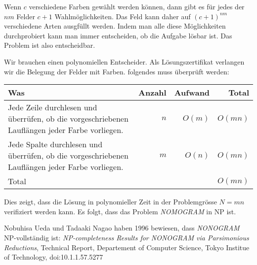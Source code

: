 \begin{loesung}
\begin{teilaufgaben}
\item
Wenn $c$ verschiedene Farben gewählt werden können, dann gibt es für
jedes der $nm$ Felder $c+1$ Wahlmöglichkeiten. 
Das Feld kann daher auf $(c+1)^{nm}$ verschiedene Arten ausgfüllt
werden.
Indem man alle diese Möglichkeiten durchprobiert kann man immer entscheiden,
ob die Aufgabe lösbar ist.
Das Problem ist also entscheidbar.
\item
Wir brauchen einen polynomiellen Entscheider.
Als Lösungszertifikat verlangen wir die Belegung der Felder mit Farben.
folgendes muss überprüft werden:
\begin{center}
\begin{tabular}{lrrr}
Was&Anzahl&Aufwand&Total\\
\hline
\begin{minipage}[t]{0.6\hsize}
\strut
Jede Zeile durchlesen und überrüfen, ob die vorgeschriebenen Lauflängen
jeder Farbe vorliegen.\strut
\end{minipage}&$n$&$O(m)$&$O(mn)$\\
\begin{minipage}[t]{0.6\hsize}
\strut
Jede Spalte durchlesen und überrüfen, ob die vorgeschriebenen Lauflängen
jeder Farbe vorliegen.\strut
\end{minipage}&$m$&$O(n)$&$O(mn)$\\
\hline
\strut
Total&&&$O(mn)$
\end{tabular}
\end{center}
Dies zeigt, dass die Lösung in polynomieller Zeit in der Problemgrösse
$N=mn$ verifiziert werden kann. 
Es folgt, dass das Problem
{\em NOMOGRAM} in NP ist.
\qedhere
\end{teilaufgaben}
\end{loesung}

\begin{diskussion}
Nobuhisa Ueda und Tadaaki Nagao haben 1996 bewiesen, dass
{\em NONOGRAM} NP-vollständig ist:
{\em NP-completeness Results for NONOGRAM via Parsimonious Reductions},
Technical Report,
Departement of Computer Science,
Tokyo Institue of Technology, doi:10.1.1.57.5277
\end{diskussion}


